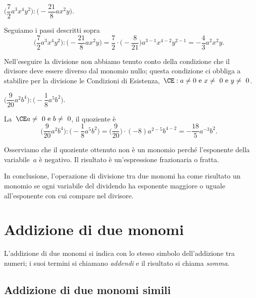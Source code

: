 \begin{exrig}
 \begin{esempio}
$\bigg(\dfrac{7}{2}a^{3}x^{{4}}y^{2}\bigg):\bigg(-{\dfrac{21}{8}}ax^{2}y\bigg)$.

Seguiamo i passi descritti sopra
\[\bigg(\frac{7}{2}a^{3}x^{{4}}y^{2}\bigg):\bigg(-{\frac{21}{8}}ax^{2}y\bigg)=\frac{7}{2}\cdot%
\bigg(-{\frac{8}{21}}\bigg)a^{3-1}x^{4-2}y^{2-1}=-{\frac{4}{3}}a^{2}x^{2}y.\]

Nell'eseguire la divisione non abbiamo tenuto conto
della condizione che il divisore deve essere diverso dal monomio nullo;
questa condizione ci obbliga a stabilire per la divisione le Condizioni
di Esistenza,~$\CE:a\neq0\text{ e }x\neq~0\text{ e }y\neq~0$.
 \end{esempio}

 \begin{esempio}
$\bigg(\dfrac{9}{20}a^{2}b^{4}\bigg):\bigg(-{\dfrac{1}{8}}a^{5}b^{2}\bigg)$.

La~$\CE a\neq~0\text{ e }b\neq~0$, il quoziente è
\[\bigg(\frac{9}{20}a^{2}b^{4}\bigg):\bigg(-{\frac{1}{8}}a^{5}b^{2}\bigg)=%
\bigg(\frac{9}{20}\bigg)\cdot(-8)a^{2-5}b^{4-2}=-{\frac{18}{5}}a^{-3}b^{2}.\]

Osserviamo che il quoziente ottenuto non è un monomio perché
l'esponente della variabile~$a$ è negativo. Il
risultato è un'espressione frazionaria o fratta.
 \end{esempio}
\end{exrig}

In conclusione, l'operazione di divisione tra due monomi
ha come risultato un monomio se ogni variabile del dividendo ha
esponente maggiore o uguale all'esponente con cui
compare nel divisore.


\vspazio\ovalbox{\risolvii \ref{ese:10.20}, \ref{ese:10.21}, \ref{ese:10.22}}

\section{Addizione di due monomi}

L'addizione di due monomi si indica con lo stesso
simbolo dell'addizione tra numeri; i suoi termini si
chiamano \emph{addendi} e il risultato si chiama \emph{somma}.

\subsection{Addizione di due monomi simili}

